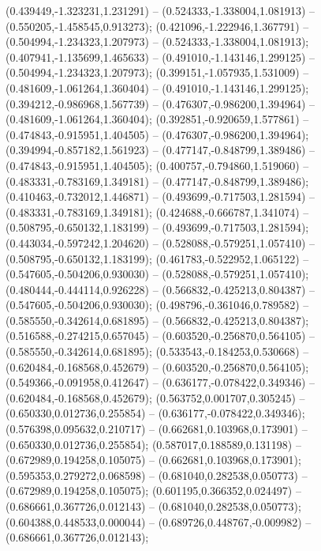  (0.439449,-1.323231,1.231291) -- (0.524333,-1.338004,1.081913) -- (0.550205,-1.458545,0.913273);
 (0.421096,-1.222946,1.367791) -- (0.504994,-1.234323,1.207973) -- (0.524333,-1.338004,1.081913);
 (0.407941,-1.135699,1.465633) -- (0.491010,-1.143146,1.299125) -- (0.504994,-1.234323,1.207973);
 (0.399151,-1.057935,1.531009) -- (0.481609,-1.061264,1.360404) -- (0.491010,-1.143146,1.299125);
 (0.394212,-0.986968,1.567739) -- (0.476307,-0.986200,1.394964) -- (0.481609,-1.061264,1.360404);
 (0.392851,-0.920659,1.577861) -- (0.474843,-0.915951,1.404505) -- (0.476307,-0.986200,1.394964);
 (0.394994,-0.857182,1.561923) -- (0.477147,-0.848799,1.389486) -- (0.474843,-0.915951,1.404505);
 (0.400757,-0.794860,1.519060) -- (0.483331,-0.783169,1.349181) -- (0.477147,-0.848799,1.389486);
 (0.410463,-0.732012,1.446871) -- (0.493699,-0.717503,1.281594) -- (0.483331,-0.783169,1.349181);
 (0.424688,-0.666787,1.341074) -- (0.508795,-0.650132,1.183199) -- (0.493699,-0.717503,1.281594);
 (0.443034,-0.597242,1.204620) -- (0.528088,-0.579251,1.057410) -- (0.508795,-0.650132,1.183199);
 (0.461783,-0.522952,1.065122) -- (0.547605,-0.504206,0.930030) -- (0.528088,-0.579251,1.057410);
 (0.480444,-0.444114,0.926228) -- (0.566832,-0.425213,0.804387) -- (0.547605,-0.504206,0.930030);
 (0.498796,-0.361046,0.789582) -- (0.585550,-0.342614,0.681895) -- (0.566832,-0.425213,0.804387);
 (0.516588,-0.274215,0.657045) -- (0.603520,-0.256870,0.564105) -- (0.585550,-0.342614,0.681895);
 (0.533543,-0.184253,0.530668) -- (0.620484,-0.168568,0.452679) -- (0.603520,-0.256870,0.564105);
 (0.549366,-0.091958,0.412647) -- (0.636177,-0.078422,0.349346) -- (0.620484,-0.168568,0.452679);
 (0.563752,0.001707,0.305245) -- (0.650330,0.012736,0.255854) -- (0.636177,-0.078422,0.349346);
 (0.576398,0.095632,0.210717) -- (0.662681,0.103968,0.173901) -- (0.650330,0.012736,0.255854);
 (0.587017,0.188589,0.131198) -- (0.672989,0.194258,0.105075) -- (0.662681,0.103968,0.173901);
 (0.595353,0.279272,0.068598) -- (0.681040,0.282538,0.050773) -- (0.672989,0.194258,0.105075);
 (0.601195,0.366352,0.024497) -- (0.686661,0.367726,0.012143) -- (0.681040,0.282538,0.050773);
 (0.604388,0.448533,0.000044) -- (0.689726,0.448767,-0.009982) -- (0.686661,0.367726,0.012143);
